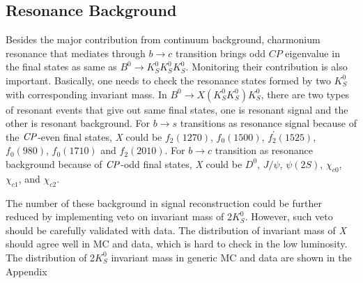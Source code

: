\subsection{Resonance Background}
Besides the major contribution from continuum background, charmonium resonance that mediates through $b \to c$ transition brings odd $\textit{CP}$ eigenvalue in the final states as same as $B^0 \to K_S^0  K_S^0  K_S^0$. Monitoring their contribution is also important. Basically, one needs to check the resonance states formed by two $K_S^0$ with corresponding invariant mass. In $B^0 \to X(K_S^0 K_S^0) K_S^0$,  there are two types of resonant events that give out same final states, one is resonant signal and the other is resonant background. For $b \to s$ transitions as resonance signal because of the $\it{CP}$-even final states, \textit{X} could be $f_2(1270)$, $f_0(1500)$, $f_{2}^{'}(1525)$, $f_0(980)$, $f_0(1710)$ and $f_2(2010)$. For $b \to c$ transition as resonance background because of $\it{CP}$-odd final states, \textit{X} could be $D^0$, $J/\psi$, $\psi(2S)$,  $\chi_{c0}$, $\chi_{c1}$, and $\chi_{c2}$.

The number of these background in signal reconstruction could be further reduced by implementing veto on invariant mass of 2$K_S^0$. However, such veto should be carefully validated with data. The distribution of invariant mass of \textit{X} should agree well in MC and data, which is hard to check in the low luminosity. The distribution of 2$K_S^0$ invariant mass in generic MC and data are shown in the Appendix 


